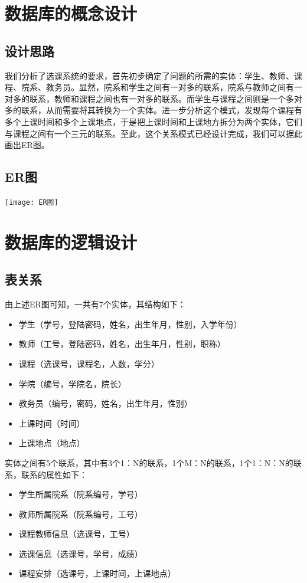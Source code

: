 \documentclass[a4paper, 11pt, nofonts, nocap, fancyhdr]{ctexart}
\begin{document}
\newpage
\section{数据库的概念设计}

\subsection{设计思路}
我们分析了选课系统的要求，首先初步确定了问题的所需的实体：学生、教师、课程、院系、教务员。显然，院系和学生之间有一对多的联系，院系与教师之间有一对多的联系，教师和课程之间也有一对多的联系。而学生与课程之间则是一个多对多的联系，从而需要将其转换为一个实体。进一步分析这个模式，发现每个课程有多个上课时间和多个上课地点，于是把上课时间和上课地方拆分为两个实体，它们与课程之间有一个三元的联系。至此，这个关系模式已经设计完成，我们可以据此画出ER图。

\subsection{ER图}
	\texttt{[image: ER图]}

\section{数据库的逻辑设计}

\subsection{表关系}
由上述ER图可知，一共有7个实体，其结构如下：
\begin{itemize}
    \item 学生（学号，登陆密码，姓名，出生年月，性别，入学年份）
    \item 教师（工号，登陆密码，姓名，出生年月，性别，职称）
    \item 课程（选课号，课程名，人数，学分）
    \item 学院（编号，学院名，院长）
    \item 教务员（编号，密码，姓名，出生年月，性别）
    \item 上课时间（时间）
    \item 上课地点（地点）
\end{itemize}

实体之间有5个联系，其中有3个1：N的联系，1个M：N的联系，1个1：N：N的联系，联系的属性如下：
\begin{itemize}
    \item 学生所属院系（院系编号，学号）
    \item 教师所属院系（院系编号，工号）
    \item 课程教师信息（选课号，工号）
    \item 选课信息（选课号，学号，成绩）
    \item 课程安排（选课号，上课时间，上课地点）
\end{itemize}
\end{document}
